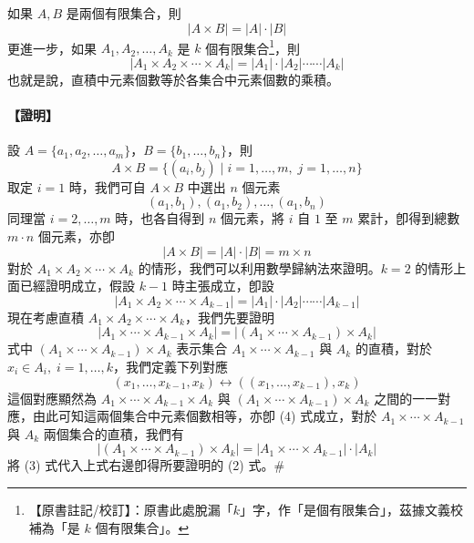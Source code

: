 \medskip
\begin{theorem*}[基本計數原則]
如果 $A, B$ 是兩個有限集合，則
\begin{equation}
|A \times B| = |A| \cdot |B| \tag{1}
\end{equation}
更進一步，如果 $A_1, A_2, \ldots, A_k$ 是 $k$ 個有限集合\label{note:b5-ch2-p58-k}\footnote{【原書註記/校訂】：原書此處脫漏「$k$」字，作「是個有限集合」，茲據文義校補為「是 $k$ 個有限集合」。}，則
\begin{equation}
|A_1 \times A_2 \times \cdots \times A_k| = |A_1| \cdot |A_2| \cdots\cdots |A_k| \tag{2}
\end{equation}
也就是說，直積中元素個數等於各集合中元素個數的乘積。
\end{theorem*}
\paragraph{【證明】}設 $A = \{a_1, a_2, \ldots, a_m\}$，$B = \{b_1, \ldots, b_n\}$，則
\[
A \times B = \{(a_i, b_j) \mid i = 1, \ldots, m,\; j = 1, \ldots, n\}
\]
取定 $i = 1$ 時，我們可自 $A \times B$ 中選出 $n$ 個元素
\[
(a_1, b_1), (a_1, b_2), \ldots, (a_1, b_n)
\]
同理當 $i = 2, \ldots, m$ 時，也各自得到 $n$ 個元素，將 $i$ 自 $1$ 至 $m$ 累計，卽得到總數 $m \cdot n$ 個元素，亦卽
\[
|A \times B| = |A| \cdot |B| = m \times n
\]
對於 $A_1 \times A_2 \times \cdots \times A_k$ 的情形，我們可以利用數學歸納法來證明。$k = 2$ 的情形上面已經證明成立，假設 $k - 1$ 時主張成立，卽設
\begin{equation}
|A_1 \times A_2 \times \cdots \times A_{k-1}| = |A_1| \cdot |A_2| \cdots\cdots |A_{k-1}| \tag{3}
\end{equation}
現在考慮直積 $A_1 \times A_2 \times \cdots \times A_k$，我們先要證明
\begin{equation}
|A_1 \times \cdots \times A_{k-1} \times A_k| = |(A_1 \times \cdots \times A_{k-1}) \times A_k| \tag{4}
\end{equation}
式中 $(A_1 \times \cdots \times A_{k-1}) \times A_k$ 表示集合 $A_1 \times \cdots \times A_{k-1}$ 與 $A_k$ 的直積，對於 $x_i \in A_i,\; i = 1, \ldots, k$，我們定義下列對應
\[
(x_1, \ldots, x_{k-1}, x_k) \longleftrightarrow ((x_1, \ldots, x_{k-1}), x_k)
\]
這個對應顯然為 $A_1 \times \cdots \times A_{k-1} \times A_k$ 與 $(A_1 \times \cdots \times A_{k-1}) \times A_k$ 之間的一一對應，由此可知這兩個集合中元素個數相等，亦卽 (4) 式成立，對於 $A_1 \times \cdots \times A_{k-1}$ 與 $A_k$ 兩個集合的直積，我們有
\[
|(A_1 \times \cdots \times A_{k-1}) \times A_k| = |A_1 \times \cdots \times A_{k-1}| \cdot |A_k|
\]
將 (3) 式代入上式右邊卽得所要證明的 (2) 式。\hfill $\#$

